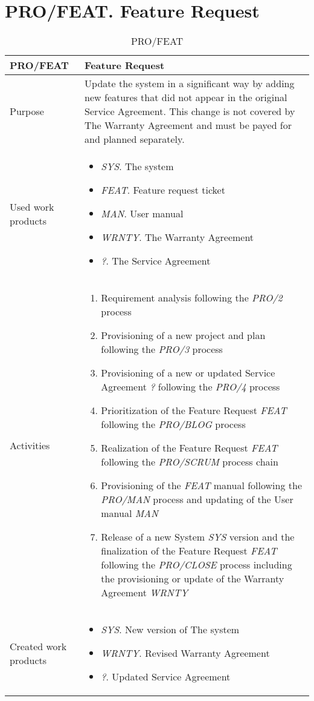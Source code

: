 \section{PRO/FEAT. Feature Request}
\begin{table}[]
\begin{tabular}{l|p{}}
\hline
\textbf{PRO/FEAT}        & \textbf{Feature Request} \\ \hline
Purpose & Update the system in a significant way by adding new features that did not appear in the original Service Agreement. This change is not covered by The Warranty Agreement and must be payed for and planned separately. \\ \hline
Used work products    &      
\begin{itemize}
    \item \textit{SYS}. The system
    \item \textit{FEAT}. Feature request ticket
    \item \textit{MAN}. User manual
    \item \textit{WRNTY}. The Warranty Agreement
    \item \textit{?}. The Service Agreement
\end{itemize}
\\ \hline
Activities            &   
\begin{enumerate}
    \item Requirement analysis following the \textit{PRO/2} process
    \item Provisioning of a new project and plan following the \textit{PRO/3} process
    \item Provisioning of a new or updated Service Agreement \textit{?} following the \textit{PRO/4} process
    \item Prioritization of the Feature Request \textit{FEAT} following the \textit{PRO/BLOG} process
    \item Realization of the Feature Request \textit{FEAT} following the \textit{PRO/SCRUM} process chain
    \item Provisioning of the \textit{FEAT} manual following the \textit{PRO/MAN} process and updating of the User manual \textit{MAN}
    \item Release of a new System \textit{SYS} version and the finalization of the Feature Request \textit{FEAT} following the \textit{PRO/CLOSE} process including the provisioning or update of the Warranty Agreement \textit{WRNTY}
\end{enumerate}
\\ \hline
Created work products &     
\begin{itemize}
    \item \textit{SYS}. New version of The system
    \item \textit{WRNTY}. Revised Warranty Agreement
    \item \textit{?}. Updated Service Agreement
\end{itemize}
\end{tabular}
\caption{PRO/FEAT}
\label{pro/FEAT}
\end{table}



